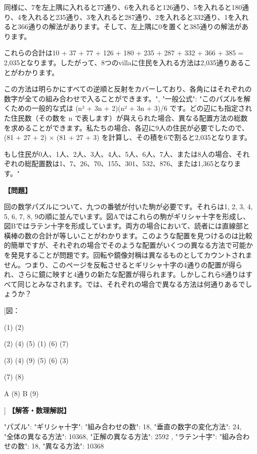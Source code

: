 \documentclass[10pt,a4paper,oneside,openany]{ltjsbook}
\begin{document}
\begin{tcolorbox}[colback=softblue,colframe=primaryblue,title=\textbf{第 276 問：THE EIGHT VILLAS.},arc=2mm,boxrule=1pt,breakable]
{同様に、7を左上隅に入れると77通り、6を入れると126通り、5を入れると180通り、4を入れると235通り、3を入れると287通り、2を入れると332通り、1を入れると366通りの解法があります。そして、左上隅に0を置くと385通りの解法があります。

これらの合計は10 + 37 + 77 + 126 + 180 + 235 + 287 + 332 + 366 + 385 = 2,035となります。したがって、8つのvillaに住民を入れる方法は2,035通りあることがわかります。

この方法は明らかにすべての逆順と反射をカバーしており、各角にはそれぞれの数字が全ての組み合わせで入ることができます。",
    "一般公式": "このパズルを解くための一般的な式は (n² + 3n + 2)(n² + 3n + 3)/6 です。どの辺にも指定された住民数（その数を n で表します）が與えられた場合、異なる配置方法の総数を求めることができます。私たちの場合、各辺に9人の住民が必要でしたので、(81 + 27 + 2) × (81 + 27 + 3) を計算し、その積を6で割ると2,035となります。

もし住民が0人、1人、2人、3人、4人、5人、6人、7人、または8人の場合、それぞれの総配置数は1、7、26、70、155、301、532、876、または1,365となります。"
}
\end{tcolorbox}

\begin{tcolorbox}[colback=softblue,colframe=primaryblue,title=\textbf{第 277 問：COUNTER CROSSES.},arc=2mm,boxrule=1pt,breakable]
\textbf{【問題】}\par\vspace{0.3em}
回の数学パズルについて、九つの番號が付いた駒が必要です。それらは1, 2, 3, 4, 5, 6, 7, 8, 9の順に並んでいます。図Aではこれらの駒がギリシャ十字を形成し、図Bではラテン十字を形成しています。両方の場合において、読者には直線部と橫棒の数の合計が等しいことがわかります。このような配置を見つけるのは比較的簡単ですが、それぞれの場合でそのような配置がいくつの異なる方法で可能かを発見することが問題です。回転や鏡像対稱は異なるものとしてカウントされません。つまり、このページを反転させるとギリシャ十字の4通りの配置が得られ、さらに鏡に映すと4通りの新たな配置が得られます。しかしこれら8通りはすべて同じとみなされます。では、それぞれの場合で異なる方法は何通りあるでしょうか？

[図：

            (1)                        (2)

            (2)                (4) (5) (1) (6) (7)

    (3) (4) (9) (5) (6)                (3)

            (7)                        (8)

    A       (8)                B       (9)

]
\tcblower
\textbf{【解答・数理解説】}\par\vspace{0.3em}
{
    "パズル": {
        "ギリシャ十字": {
            "組み合わせの数": 18,
            "垂直の数字の変化方法": 24,
            "全体の異なる方法": 10368,
            "正解の異なる方法": 2592
        },
        "ラテン十字": {
            "組み合わせの数": 18,
            "異なる方法": 10368
        }
    }
}
\end{tcolorbox}
\end{document}
